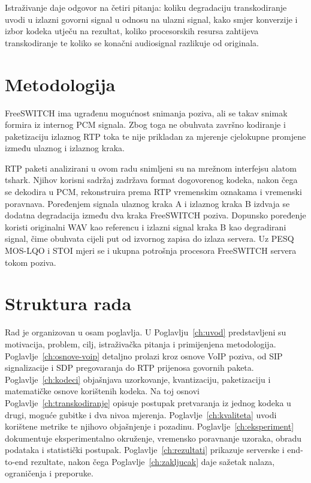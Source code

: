 Istraživanje daje odgovor na četiri pitanja: koliku degradaciju transkodiranje uvodi u izlazni govorni signal u odnosu na ulazni signal, kako smjer konverzije i izbor kodeka utječu na rezultat, koliko procesorskih resursa zahtijeva transkodiranje te koliko se konačni audiosignal razlikuje od originala.

\section{Metodologija}

FreeSWITCH ima ugrađenu mogućnost snimanja poziva, ali se takav snimak formira iz internog PCM signala. Zbog toga ne obuhvata završno kodiranje i paketizaciju izlaznog RTP toka te nije prikladan za mjerenje cjelokupne promjene između ulaznog i izlaznog kraka.

RTP paketi analizirani u ovom radu snimljeni su na mrežnom interfejsu alatom tshark. Njihov korisni sadržaj zadržava format dogovorenog kodeka, nakon čega se dekodira u PCM, rekonstruira prema RTP vremenskim oznakama i vremenski poravnava. Poređenjem signala ulaznog kraka A i izlaznog kraka B izdvaja se dodatna degradacija između dva kraka FreeSWITCH poziva. Dopunsko poređenje koristi originalni WAV kao referencu i izlazni signal kraka B kao degradirani signal, čime obuhvata cijeli put od izvornog zapisa do izlaza servera. Uz PESQ MOS-LQO i STOI mjeri se i ukupna potrošnja procesora FreeSWITCH servera tokom poziva.

\section{Struktura rada}

Rad je organizovan u osam poglavlja. U Poglavlju~\ref{ch:uvod} predstavljeni su motivacija, problem, cilj, istraživačka pitanja i primijenjena metodologija. Poglavlje~\ref{ch:osnove-voip} detaljno prolazi kroz osnove VoIP poziva, od SIP signalizacije i SDP pregovaranja do RTP prijenosa govornih paketa. Poglavlje~\ref{ch:kodeci} objašnjava uzorkovanje, kvantizaciju, paketizaciju i matematičke osnove korištenih kodeka. Na toj osnovi Poglavlje~\ref{ch:transkodiranje} opisuje postupak pretvaranja iz jednog kodeka u drugi, moguće gubitke i dva nivoa mjerenja. Poglavlje~\ref{ch:kvaliteta} uvodi korištene metrike te njihovo objašnjenje i pozadinu. Poglavlje~\ref{ch:eksperiment} dokumentuje eksperimentalno okruženje, vremensko poravnanje uzoraka, obradu podataka i statistički postupak. Poglavlje~\ref{ch:rezultati} prikazuje serverske i end-to-end rezultate, nakon čega Poglavlje~\ref{ch:zakljucak} daje sažetak nalaza, ograničenja i preporuke.
